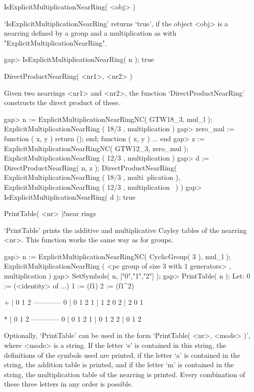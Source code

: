 \>IsExplicitMultiplicationNearRing( <obj> )

`IsExplicitMultiplicationNearRing' returns `true', if the object <obj> is
a nearring defined by a group and a multiplication as with
"ExplicitMultiplicationNearRing".

\beginexample
    gap> IsExplicitMultiplicationNearRing( n );
    true
\endexample



\>DirectProductNearRing( <nr1>, <nr2> )

Given two nearrings <nr1> and <nr2>, the function `DirectProductNearRing'
constructs the direct product of these.

\beginexample
    gap> n := ExplicitMultiplicationNearRingNC( GTW18_3, mul_l );
    ExplicitMultiplicationNearRing ( 18/3 , multiplication )
    gap> zero_mul := function ( x, y ) return (); end;
    function ( x, y ) ... end
    gap> z := ExplicitMultiplicationNearRingNC( GTW12_3, zero_mul );
    ExplicitMultiplicationNearRing ( 12/3 , multiplication )
    gap> d := DirectProductNearRing( n, z );
    DirectProductNearRing( ExplicitMultiplicationNearRing ( 18/3 , multi\
    plication ), ExplicitMultiplicationNearRing ( 12/3 , multiplication \
    ) )
    gap> IsExplicitMultiplicationNearRing( d );
    true
\endexample



\>PrintTable( <nr> )!{near rings}

`PrintTable' prints the additive and multiplicative Cayley tables of the 
nearring <nr>. This function works the same way as for groups.

\beginexample
    gap> n := ExplicitMultiplicationNearRingNC( CyclicGroup( 3 ), mul_l );
    ExplicitMultiplicationNearRing ( <pc group of size 3 with 
    1 generators> , multiplication )
    gap> SetSymbols( n, ["0","1","2"] );
    gap> PrintTable( n );               
    Let:
    0 := (<identity> of ...)
    1 := (f1)
    2 := (f1^2)

      +  | 0  1  2  
      ------------
      0  | 0  1  2  
      1  | 1  2  0  
      2  | 2  0  1  

      *  | 0  1  2  
      ------------
      0  | 0  1  2  
      1  | 0  1  2  
      2  | 0  1  2  
\endexample

Optionally, `PrintTable' can be used in the form `PrintTable( <nr>, <mode> )', 
where <mode> is a string. If the letter `e' is contained in this string, the 
definitions of the symbols used are printed, if the letter `a' is contained 
in the string, the addition table is printed, and if the letter `m' is contained
in the string, the multiplication table of the nearring is printed. Every 
combination of these three letters in any order is possible.

